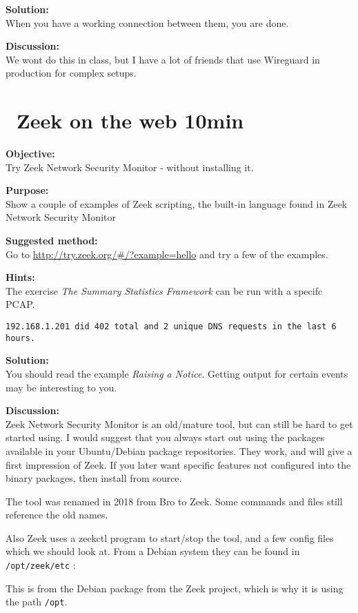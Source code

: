 \documentclass[a4paper,11pt,notitlepage]{report}
\begin{document}
{\bf Solution:}\\
When you have a working connection between them, you are done.

{\bf Discussion:}\\
We wont do this in class, but I have a lot of friends that use Wireguard in production for complex setups.



\chapter{\faInfoCircle\ Zeek on the web 10min}
\label{ex:zeekweb}


{\bf Objective:} \\
Try Zeek Network Security Monitor - without installing it.


{\bf Purpose:}\\
Show a couple of examples of Zeek scripting, the built-in language found in Zeek Network Security Monitor


{\bf Suggested method:}\\
Go to \url{http://try.zeek.org/#/?example=hello} and try a few of the examples.

{\bf Hints:}\\
The exercise
\emph{The Summary Statistics Framework} can be run with a specifc PCAP.

\verb+192.168.1.201 did 402 total and 2 unique DNS requests in the last 6 hours.+

{\bf Solution:}\\
You should read the example \emph{Raising a Notice}. Getting output for certain events may be interesting to you.


{\bf Discussion:}\\
Zeek Network Security Monitor is an old/mature tool, but can still be hard to get started using. I would suggest that you always start out using the packages available in your Ubuntu/Debian package repositories.  They work, and will give a first impression of Zeek. If you later want specific features not configured into the binary packages, then install from source.

The tool was renamed in 2018 from Bro to Zeek. Some commands and files still reference the old names.

Also Zeek uses a zeekctl program to start/stop the tool, and a few config files which we should look at. From a Debian system they can be found in \verb+/opt/zeek/etc+ :

This is from the Debian package from the Zeek project, which is why it is using the path \verb+/opt+.
\end{document}
